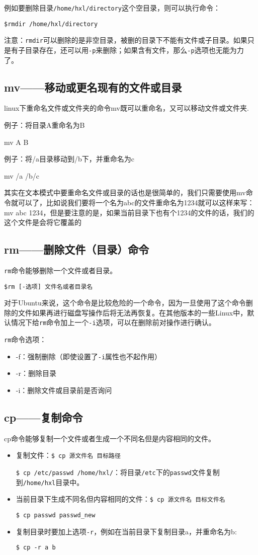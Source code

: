 例如要删除目录\verb*|/home/hxl/directory|这个空目录，则可以执行命令：

\verb*|$rmdir /home/hxl/directory|

注意：\verb*|rmdir|可以删除的是非空目录，被删的目录下不能有文件或子目录。如果只是有子目录存在，还可以用\verb*|-p|来删除；如果含有文件，那么\verb*|-p|选项也无能为力了。


\subsection{mv——移动或更名现有的文件或目录}
linux下重命名文件或文件夹的命令mv既可以重命名，又可以移动文件或文件夹.

例子：将目录A重命名为B

mv A B

例子：将/a目录移动到/b下，并重命名为c

mv /a /b/c

其实在文本模式中要重命名文件或目录的话也是很简单的，我们只需要使用mv命令就可以了，比如说我们要将一个名为abc的文件重命名为1234就可以这样来写：mv abc 1234，但是要注意的是，如果当前目录下也有个1234的文件的话，我们的这个文件是会将它覆盖的


\subsection{rm——删除文件（目录）命令}
\verb*|rm|命令能够删除一个文件或者目录。

\verb*|$rm [-选项] 文件名或者目录名|

对于Ubuntu来说，这个命令是比较危险的一个命令，因为一旦使用了这个命令删除的文件如果再进行磁盘写操作后将无法再恢复。在其他版本的一些Linux中，默认情况下给\verb*|rm|命令加上一个\verb*|-i|选项，可以在删除前对操作进行确认。

\verb*|rm|命令选项：
\begin{itemize}
\item -f：强制删除（即使设置了\verb*|-i|属性也不起作用）
\item -r：删除目录
\item -i：删除文件或目录前是否询问
\end{itemize}


\subsection{cp——复制命令}
cp命令能够复制一个文件或者生成一个不同名但是内容相同的文件。
\begin{itemize}
\item 复制文件：\verb*|$ cp 源文件名 目标路径|

\verb*|$ cp /etc/passwd /home/hxl/|：将目录\verb|/etc|下的\verb|passwd|文件复制到\verb|/home/hxl|目录中。

\item 当前目录下生成不同名但内容相同的文件：\verb*|$ cp 源文件名 目标文件名|

\verb*|$ cp passwd passwd_new|

\item 复制目录时要加上选项\verb*|-r|，例如在当前目录下复制目录a，并重命名为b:

\verb*|$ cp -r a b|
\end{itemize}


